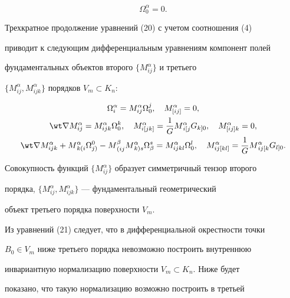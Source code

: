 \begin{equation} 


\Omega^\alpha_0=0. 


\end{equation} 


 


Трехкратное продолжение уравнений (20) с учетом соотношения (4) 


приводит к следующим дифференциальным уравнениям компонент полей 


фундаментальных объектов второго $\{M^\alpha_{ij}\}$ и третьего 


$\{M^\alpha_{ij},M^\alpha_{ijk}\}$ порядков $V_m\subset K_n$: 


\begin{gather} 


\Omega^\alpha_i=M^\alpha_{ij}\Omega^j_0,\quad 


M^\alpha_{[ij]}=0,\notag \\ 


\wt\nabla M^\alpha_{ij}=M^\alpha_{ijk}\Omega^k_0,\quad 


M^\alpha_{i[jk]}=\frac{1}{G}M{}^\alpha_{i[j}G{}_{k]0},\quad 


M^\alpha_{[ij]k}=0,\notag \\ 


\wt\nabla M^\alpha_{ijk}+M{}^\alpha_{k(i}\Omega{}^0_{j)}- 


M{}^\beta_{(ij}M{}^\alpha_{k)s}\Omega^s_\beta= 


M^\alpha_{ijkl}\Omega^l_0,\quad M^\alpha_{ij[kl]}= 


\frac{1}{G}M{}^\alpha_{ij[k}G{}_{l]0}. 


\end{gather} 


Совокупность функций $\{M^\alpha_{ij}\}$ образует симметричный тензор второго 


порядка, $\{M^\alpha_{ij},M^\alpha_{ijk}\}$ --- фундаментальный геометрический 


объект третьего порядка поверхности $V_m$. 


 


Из уравнений (21) следует, что в дифференциальной окрестности точки 


$B_0\in V_m$ ниже третьего порядка невозможно построить внутреннюю 


инвариантную нормализацию поверхности $V_m\subset K_n$. Ниже будет 


показано, что такую нормализацию возможно построить в третьей 


